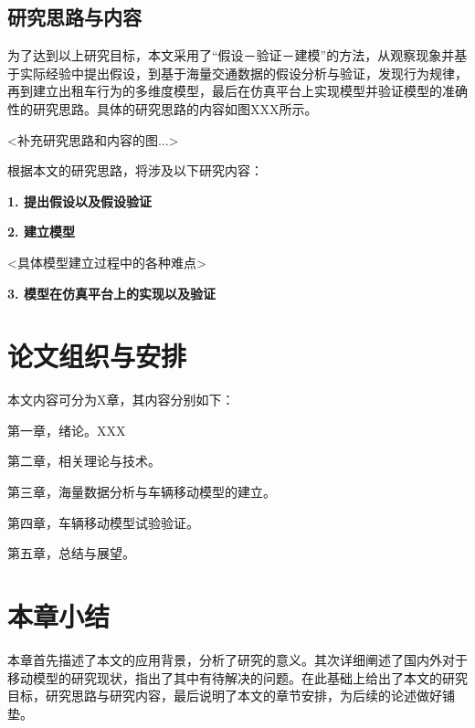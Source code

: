 \subsection{研究思路与内容}

为了达到以上研究目标，本文采用了“假设－验证－建模”的方法，从观察现象并基于实际经验中提出假设，到基于海量交通数据的假设分析与验证，发现行为规律，再到建立出租车行为的多维度模型，最后在仿真平台上实现模型并验证模型的准确性的研究思路。具体的研究思路的内容如图XXX所示。

<补充研究思路和内容的图...>

根据本文的研究思路，将涉及以下研究内容：

\textbf{1. 提出假设以及假设验证}

\textbf{2. 建立模型}

<具体模型建立过程中的各种难点>

\textbf{3. 模型在仿真平台上的实现以及验证}

\section{论文组织与安排}

本文内容可分为X章，其内容分别如下：

第一章，绪论。XXX

第二章，相关理论与技术。

第三章，海量数据分析与车辆移动模型的建立。

第四章，车辆移动模型试验验证。

第五章，总结与展望。

\section{本章小结}

本章首先描述了本文的应用背景，分析了研究的意义。其次详细阐述了国内外对于移动模型的研究现状，指出了其中有待解决的问题。在此基础上给出了本文的研究目标，研究思路与研究内容，最后说明了本文的章节安排，为后续的论述做好铺垫。